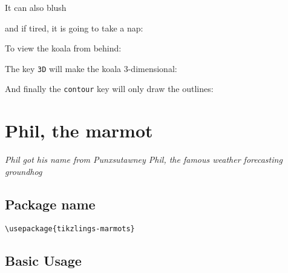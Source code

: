 \documentclass[parskip=half]{scrartcl}
\begin{document}
It can also blush
\begin{tcblisting}{}
\koala[blush=red]
\end{tcblisting}

and if tired, it is going to take a nap:
\begin{tcblisting}{}
\koala[sleeping]
\end{tcblisting}

To view the koala from behind:
\begin{tcblisting}{}
\koala[back]
\end{tcblisting}

The key \lstinline|3D| will make the koala 3-dimensional:
\begin{tcblisting}{}
\koala[3D]
\end{tcblisting}

And finally the \lstinline|contour| key will only draw the outlines:
\begin{tcblisting}{}
\koala[contour=black]
\end{tcblisting}

%
%
\clearpage
\section[Marmot]{Phil, the marmot}

\emph{Phil got his name from Punxsutawney Phil, the famous weather forecasting groundhog}

\subsection{Package name}

\begin{tcolorbox}[lower separated=false, lefthand width=.8\linewidth]
\vspace*{0.5cm}
\lstinline|\usepackage{tikzlings-marmots}| 
\vspace*{0.5cm}
\end{tcolorbox}

\subsection{Basic Usage}

\begin{tcblisting}{}
\marmot
\end{tcblisting}
\end{document}
